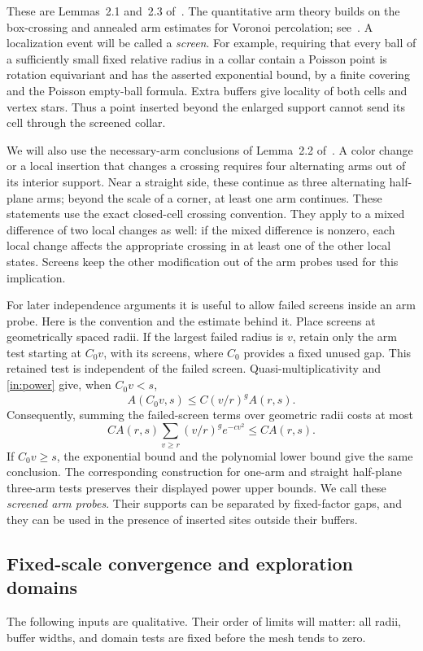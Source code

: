 These are Lemmas~2.1 and~2.3 of~\cite{V}. The quantitative arm theory
builds on the box-crossing and annealed arm estimates for Voronoi
percolation; see~\cite{Tassion,Vanneuville}. A localization event will
be called a \emph{screen}. For example, requiring that every ball of
a sufficiently small fixed relative radius in a collar contain a
Poisson point is rotation equivariant and has the asserted exponential
bound, by a finite covering and the Poisson empty-ball formula.
Extra buffers give locality of both cells and vertex stars. Thus a
point inserted beyond the enlarged support cannot send its cell through
the screened collar.

We will also use the necessary-arm conclusions of Lemma~2.2
of~\cite{V}. A color change or a local insertion that changes a
crossing requires four alternating arms out of its interior support.
Near a straight side, these continue as three alternating half-plane
arms; beyond the scale of a corner, at least one arm continues. These
statements use the exact closed-cell crossing convention. They apply
to a mixed difference of two local changes as well: if the mixed
difference is nonzero, each local change affects the appropriate
crossing in at least one of the other local states. Screens keep the
other modification out of the arm probes used for this implication.

For later independence arguments it is useful to allow failed screens
inside an arm probe. Here is the convention and the estimate behind it.
Place screens at geometrically spaced radii. If the largest failed
radius is $v$, retain only the arm test starting at $C_0v$, with its
screens, where $C_0$ provides a fixed unused gap. This retained test
is independent of the failed screen. Quasi-multiplicativity and
\eqref{in:power} give, when $C_0v<s$,
\[
 A(C_0v,s)\le C(v/r)^g A(r,s).
\]
Consequently, summing the failed-screen terms over geometric radii
costs at most
\[
 C A(r,s)\sum_{v\ge r}(v/r)^g e^{-cv^2}
 \le C A(r,s).
\]
If $C_0v\ge s$, the exponential bound and the polynomial lower bound
give the same conclusion. The corresponding construction for one-arm
and straight half-plane three-arm tests preserves their displayed
power upper bounds. We call these \emph{screened arm probes}. Their
supports can be separated by fixed-factor gaps, and they can be used
in the presence of inserted sites outside their buffers.

\subsection{Fixed-scale convergence and exploration domains}
The following inputs are qualitative. Their order of limits will matter:
all radii, buffer widths, and domain tests are fixed before the mesh
tends to zero.

